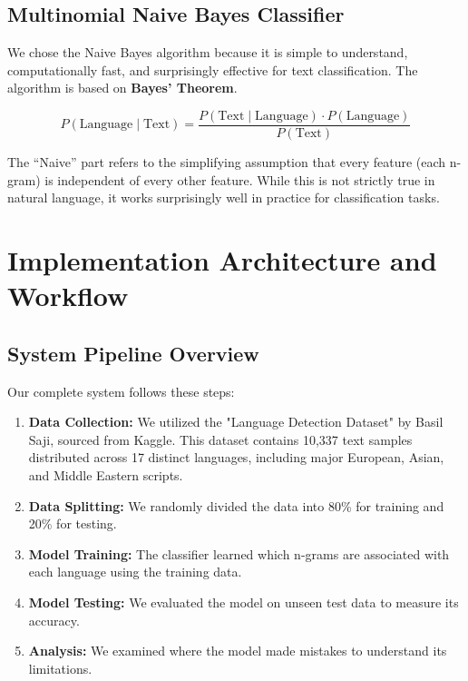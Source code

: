\documentclass[conference]{IEEEtran}
\begin{document}
\subsection{Multinomial Naive Bayes Classifier}

We chose the Naive Bayes algorithm because it is simple to understand, computationally fast, and surprisingly effective for text classification. The algorithm is based on \textbf{Bayes' Theorem}.

\begin{equation}
P(\text{Language} \mid \text{Text}) = \frac{P(\text{Text} \mid \text{Language}) \cdot P(\text{Language})}{P(\text{Text})}
\end{equation}

The ``Naive'' part refers to the simplifying assumption that every feature (each n-gram) is independent of every other feature. While this is not strictly true in natural language, it works surprisingly well in practice for classification tasks.

\section{Implementation Architecture and Workflow}

\subsection{System Pipeline Overview}

Our complete system follows these steps:

\begin{enumerate}
    \item \textbf{Data Collection:} We utilized the "Language Detection Dataset" by Basil Saji, sourced from Kaggle. This dataset contains 10,337 text samples distributed across 17 distinct languages, including major European, Asian, and Middle Eastern scripts.
    \item \textbf{Data Splitting:} We randomly divided the data into 80\% for training and 20\% for testing.
    \item \textbf{Model Training:} The classifier learned which n-grams are associated with each language using the training data.
    \item \textbf{Model Testing:} We evaluated the model on unseen test data to measure its accuracy.
    \item \textbf{Analysis:} We examined where the model made mistakes to understand its limitations.
\end{enumerate}
\end{document}
